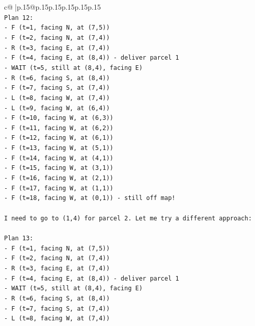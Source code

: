 \documentclass{article}
\begin{document}
{\begin{supertabular}{c@{$\;$}|p{.15\linewidth}@{}p{.15\linewidth}p{.15\linewidth}p{.15\linewidth}p{.15\linewidth}p{.15\linewidth}}
{{{\\ 
\texttt{Plan 12:} \\
\texttt{{-} F (t=1, facing N, at (7,5))} \\
\texttt{{-} F (t=2, facing N, at (7,4))} \\
\texttt{{-} R (t=3, facing E, at (7,4))} \\
\texttt{{-} F (t=4, facing E, at (8,4)) {-} deliver parcel 1} \\
\texttt{{-} WAIT (t=5, still at (8,4), facing E)} \\
\texttt{{-} R (t=6, facing S, at (8,4))} \\
\texttt{{-} F (t=7, facing S, at (7,4))} \\
\texttt{{-} L (t=8, facing W, at (7,4))} \\
\texttt{{-} L (t=9, facing W, at (6,4))} \\
\texttt{{-} F (t=10, facing W, at (6,3))} \\
\texttt{{-} F (t=11, facing W, at (6,2))} \\
\texttt{{-} F (t=12, facing W, at (6,1))} \\
\texttt{{-} F (t=13, facing W, at (5,1))} \\
\texttt{{-} F (t=14, facing W, at (4,1))} \\
\texttt{{-} F (t=15, facing W, at (3,1))} \\
\texttt{{-} F (t=16, facing W, at (2,1))} \\
\texttt{{-} F (t=17, facing W, at (1,1))} \\
\texttt{{-} F (t=18, facing W, at (0,1)) {-} still off map!} \\
\\ 
\texttt{I need to go to (1,4) for parcel 2. Let me try a different approach:} \\
\\ 
\texttt{Plan 13:} \\
\texttt{{-} F (t=1, facing N, at (7,5))} \\
\texttt{{-} F (t=2, facing N, at (7,4))} \\
\texttt{{-} R (t=3, facing E, at (7,4))} \\
\texttt{{-} F (t=4, facing E, at (8,4)) {-} deliver parcel 1} \\
\texttt{{-} WAIT (t=5, still at (8,4), facing E)} \\
\texttt{{-} R (t=6, facing S, at (8,4))} \\
\texttt{{-} F (t=7, facing S, at (7,4))} \\
\texttt{{-} L (t=8, facing W, at (7,4))} \\
}}}
\end{supertabular}}
\end{document}
